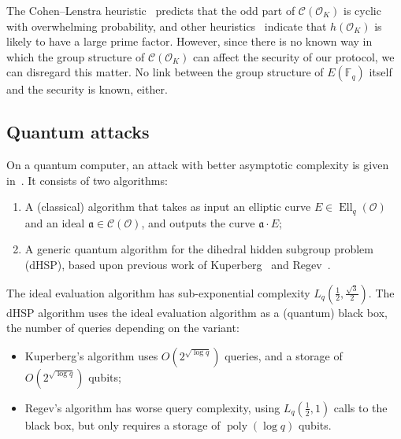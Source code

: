 \documentclass{llncs}
\newcommand{\F}{\mathbb{F}}
\newcommand{\Cl}{\mathcal{C}}
\renewcommand{\O}{\mathcal{O}}
\renewcommand{\frak}{\mathfrak}
\DeclareMathOperator{\Ell}{Ell}
\DeclareMathOperator{\poly}{poly}
\begin{document}
\begin{remark}
  The Cohen--Lenstra heuristic~\cite{10.1007/BFb0099440} predicts that
  the odd part of $\Cl(\O_K)$ is cyclic with overwhelming
  probability, and other heuristics~\cite{10.1007/3-540-44448-3_18}
  indicate that $h(\O_K)$ is likely to have a large prime factor.
  However, since there is no known way in which the group structure of
  $\Cl(\O_K)$ can affect the security of our protocol, we can 
  disregard this matter. No link between the group structure
	of $E(\F_q)$ itself and the security is known, either.
\end{remark}

\subsection{Quantum attacks}
\label{sec:quantum-attacks}

On a quantum computer, an attack with better asymptotic complexity is
given in~\cite{childs2014constructing}. It consists of two algorithms:
\begin{enumerate}
\item A (classical) algorithm that takes as input an elliptic curve
  $E∈\Ell_q(\O)$ and an ideal $\frak a∈\Cl(\O)$, and outputs the curve
  $\frak a·E$;
\item A generic quantum algorithm for the dihedral hidden subgroup
  problem (dHSP), based upon previous work of Kuperberg~\cite{Kup} and
  Regev~\cite{regev04}.
\end{enumerate}

The ideal evaluation algorithm has sub-exponential complexity
$L_q(\frac{1}{2},\frac{\sqrt{3}}{2})$.  The dHSP algorithm uses the
ideal evaluation algorithm as a (quantum) black box, the number of
queries depending on the variant:
\begin{itemize}
\item Kuperberg's algorithm uses $O(2^{\sqrt{\log q}})$ queries, and a
  storage of $O(2^{\sqrt{\log q}})$ qubits;
\item Regev's algorithm has worse query complexity, using
  $L_q(\frac{1}{2},1)$ calls to the black box, but only requires a
  storage of $\poly(\log q)$ qubits.
\end{itemize}
\end{document}
